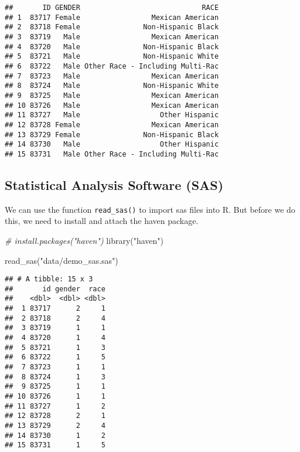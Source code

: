 \documentclass[
]{book}
\newenvironment{Shaded}{\begin{snugshade}}{\end{snugshade}}
\newcommand{\CommentTok}[1]{\textcolor[rgb]{0.56,0.35,0.01}{\textit{#1}}}
\newcommand{\FunctionTok}[1]{\textcolor[rgb]{0.00,0.00,0.00}{#1}}
\newcommand{\NormalTok}[1]{#1}
\newcommand{\StringTok}[1]{\textcolor[rgb]{0.31,0.60,0.02}{#1}}
\begin{document}
\begin{verbatim}
##       ID GENDER                             RACE
## 1  83717 Female                 Mexican American
## 2  83718 Female               Non-Hispanic Black
## 3  83719   Male                 Mexican American
## 4  83720   Male               Non-Hispanic Black
## 5  83721   Male               Non-Hispanic White
## 6  83722   Male Other Race - Including Multi-Rac
## 7  83723   Male                 Mexican American
## 8  83724   Male               Non-Hispanic White
## 9  83725   Male                 Mexican American
## 10 83726   Male                 Mexican American
## 11 83727   Male                   Other Hispanic
## 12 83728 Female                 Mexican American
## 13 83729 Female               Non-Hispanic Black
## 14 83730   Male                   Other Hispanic
## 15 83731   Male Other Race - Including Multi-Rac
\end{verbatim}

\hypertarget{statistical-analysis-software-sas}{%
\subsection{Statistical Analysis Software (SAS)}\label{statistical-analysis-software-sas}}

We can use the function \texttt{read\_sas()} to import sas files into R. But before we do this, we need to install and attach the haven package.

\begin{Shaded}
\begin{Highlighting}[]
\CommentTok{\# install.packages("haven")}
\FunctionTok{library}\NormalTok{(}\StringTok{"haven"}\NormalTok{)}

\FunctionTok{read\_sas}\NormalTok{(}\StringTok{"data/demo\_sas.sas"}\NormalTok{)}
\end{Highlighting}
\end{Shaded}

\begin{verbatim}
## # A tibble: 15 x 3
##       id gender  race
##    <dbl>  <dbl> <dbl>
##  1 83717      2     1
##  2 83718      2     4
##  3 83719      1     1
##  4 83720      1     4
##  5 83721      1     3
##  6 83722      1     5
##  7 83723      1     1
##  8 83724      1     3
##  9 83725      1     1
## 10 83726      1     1
## 11 83727      1     2
## 12 83728      2     1
## 13 83729      2     4
## 14 83730      1     2
## 15 83731      1     5
\end{verbatim}
\end{document}
